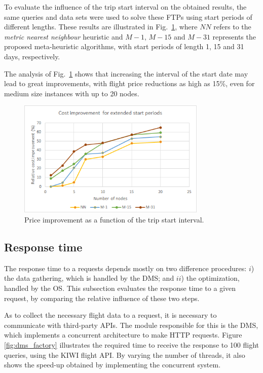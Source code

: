 To evaluate the influence of the trip start interval on the obtained results, the same queries and data sets were used to solve these FTPs using start periods of different lengths.
These results are illustrated in Fig.~\ref{fig:cost_vs_start_period}, where $NN$ refers to the \textit{metric nearest neighbour} heuristic and $M-1$, $M-15$ and $M-31$ represents the proposed meta-heuristic algorithms, with start periods of length 1, 15 and 31 days, respectively. 

The analysis of Fig.~\ref{fig:cost_vs_start_period} shows that increasing the interval of the start date may lead to great improvements, with flight price reductions as high as 15\%, even for medium size instances with up to 20 nodes.  

\begin{figure}[h]
  \centering
  \includegraphics[width=9cm]{./imgs/cost_improvement_startdates.png}
  \caption{Price improvement as a function of the trip start interval.}
  \label{fig:cost_vs_start_period}  
\end{figure}


\subsection{Response time}
\label{sec:response_time}

The response time to a requests depends mostly on two difference procedures: $i$) the data gathering, which is handled by the DMS; and $ii$) the optimization, handled by the OS. This subsection evaluates the response time to a given request, by comparing the relative influence of these two steps. 

As to collect the necessary flight data to a request, it is necessary to communicate with third-party APIs. The module responsible for this is the DMS, which implements a concurrent architecture to make HTTP requests. Figure \ref{fig:dms_factory} illustrates the required time to receive the response to 100 flight queries, using the KIWI flight API. By varying the number of threads, it also shows the speed-up obtained by implementing the concurrent system.

